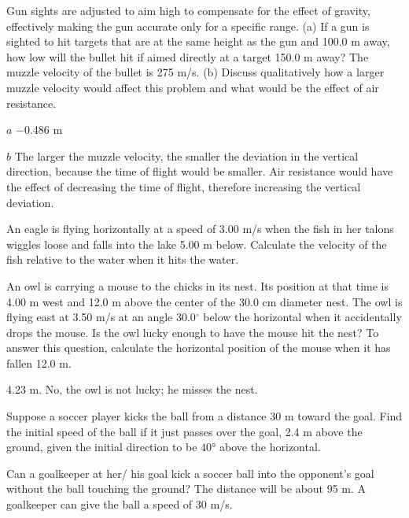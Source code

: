 \documentclass[
]{book}
\newenvironment{problems-exercises}{}{}
\begin{document}
\begin{problems-exercises}
\hypertarget{fs-id1796436}{}
\leavevmode\hypertarget{fs-id1979282}{}%
Gun sights are adjusted to aim high to compensate for the effect of
gravity, effectively making the gun accurate only for a specific range.
(a) If a gun is sighted to hit targets that are at the same height as
the gun and 100.0 m away, how low will the bullet hit if aimed directly
at a target 150.0 m away? The muzzle velocity of the bullet is 275 m/s.
(b) Discuss qualitatively how a larger muzzle velocity would affect this
problem and what would be the effect of air resistance.

\leavevmode\hypertarget{fs-id2175653}{}%
\(a\) −0.486 m

\(b\) The larger the muzzle velocity, the smaller the deviation in the
vertical direction, because the time of flight would be smaller. Air
resistance would have the effect of decreasing the time of flight,
therefore increasing the vertical deviation.

\hypertarget{fs-id2177814}{}
\leavevmode\hypertarget{fs-id1781566}{}%
An eagle is flying horizontally at a speed of 3.00 m/s when the fish in
her talons wiggles loose and falls into the lake 5.00 m below. Calculate
the velocity of the fish relative to the water when it hits the water.

\hypertarget{fs-id1914025}{}
\leavevmode\hypertarget{fs-id2057849}{}%
An owl is carrying a mouse to the chicks in its nest. Its position at
that time is 4.00 m west and 12.0 m above the center of the 30.0 cm
diameter nest. The owl is flying east at 3.50 m/s at an angle
\(30.0{^\circ}{}\) below the horizontal when it accidentally drops the
mouse. Is the owl lucky enough to have the mouse hit the nest? To answer
this question, calculate the horizontal position of the mouse when it
has fallen 12.0 m.

\leavevmode\hypertarget{fs-id2042074}{}%
4.23 m. No, the owl is not lucky; he misses the nest.

\hypertarget{fs-id1403577}{}
\leavevmode\hypertarget{fs-id2865734}{}%
Suppose a soccer player kicks the ball from a distance 30 m toward the
goal. Find the initial speed of the ball if it just passes over the
goal, 2.4 m above the ground, given the initial direction to be
\(\text{40°}{}\) above the horizontal.

\hypertarget{fs-id2260735}{}
\leavevmode\hypertarget{fs-id1789803}{}%
Can a goalkeeper at her/ his goal kick a soccer ball into the
opponent's goal without the ball touching the ground? The distance will
be about 95 m. A goalkeeper can give the ball a speed of 30 m/s.


\end{problems-exercises}
\end{document}
